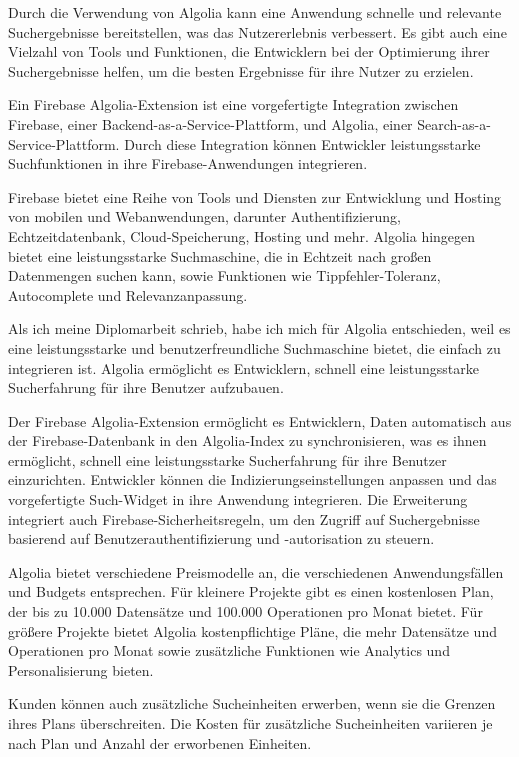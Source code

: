 Durch die Verwendung von Algolia kann eine Anwendung schnelle und relevante Suchergebnisse bereitstellen, was das Nutzererlebnis verbessert. Es gibt auch eine Vielzahl von Tools und Funktionen, die Entwicklern bei der Optimierung ihrer Suchergebnisse helfen, um die besten Ergebnisse für ihre Nutzer zu erzielen.

Ein Firebase Algolia-Extension ist eine vorgefertigte Integration zwischen Firebase, einer Backend-as-a-Service-Plattform, und Algolia, einer Search-as-a-Service-Plattform. Durch diese Integration können Entwickler leistungsstarke Suchfunktionen in ihre Firebase-Anwendungen integrieren.

Firebase bietet eine Reihe von Tools und Diensten zur Entwicklung und Hosting von mobilen und Webanwendungen, darunter Authentifizierung, Echtzeitdatenbank, Cloud-Speicherung, Hosting und mehr. Algolia hingegen bietet eine leistungsstarke Suchmaschine, die in Echtzeit nach großen Datenmengen suchen kann, sowie Funktionen wie Tippfehler-Toleranz, Autocomplete und Relevanzanpassung.

Als ich meine Diplomarbeit schrieb, habe ich mich für Algolia entschieden, weil es eine leistungsstarke und benutzerfreundliche Suchmaschine bietet, die einfach zu integrieren ist. Algolia ermöglicht es Entwicklern, schnell eine leistungsstarke Sucherfahrung für ihre Benutzer aufzubauen.

Der Firebase Algolia-Extension ermöglicht es Entwicklern, Daten automatisch aus der Firebase-Datenbank in den Algolia-Index zu synchronisieren, was es ihnen ermöglicht, schnell eine leistungsstarke Sucherfahrung für ihre Benutzer einzurichten. Entwickler können die Indizierungseinstellungen anpassen und das vorgefertigte Such-Widget in ihre Anwendung integrieren. Die Erweiterung integriert auch Firebase-Sicherheitsregeln, um den Zugriff auf Suchergebnisse basierend auf Benutzerauthentifizierung und -autorisation zu steuern.

Algolia bietet verschiedene Preismodelle an, die verschiedenen Anwendungsfällen und Budgets entsprechen. Für kleinere Projekte gibt es einen kostenlosen Plan, der bis zu 10.000 Datensätze und 100.000 Operationen pro Monat bietet. Für größere Projekte bietet Algolia kostenpflichtige Pläne, die mehr Datensätze und Operationen pro Monat sowie zusätzliche Funktionen wie Analytics und Personalisierung bieten.

Kunden können auch zusätzliche Sucheinheiten erwerben, wenn sie die Grenzen ihres Plans überschreiten. Die Kosten für zusätzliche Sucheinheiten variieren je nach Plan und Anzahl der erworbenen Einheiten.

